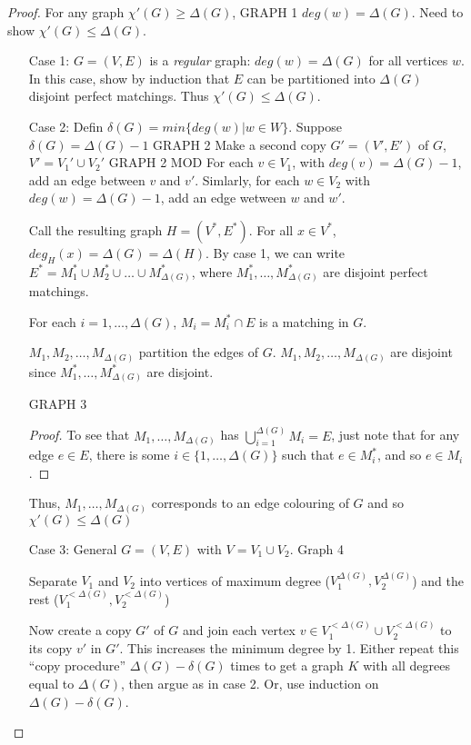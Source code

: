 \documentclass{article}
\begin{document}
\begin{proof}
For any graph $\chi'(G) \geq \Delta(G)$, GRAPH 1 $deg(w) = \Delta(G)$.  Need to show $\chi'(G)\leq \Delta(G)$.
\begin{enumerate}
\item[Case 1: ] $G=(V,E)$ is a \emph{regular} graph: $deg(w)=\Delta(G)$ for all vertices $w$.  In this case, show by induction that $E$ can be partitioned into $\Delta(G)$ disjoint perfect matchings.  Thus $\chi'(G) \leq \Delta(G)$.
\item[Case 2: ]  Defin $\delta(G) = min\{ deg(w) | w \in W\}$.  Suppose $\delta(G) = \Delta(G)-1$ GRAPH 2 
Make a second copy $G'=(V',E')$ of $G$, $V' = V_1' \cup V_2'$
GRAPH 2 MOD
For each $v \in V_1$,  with $deg(v) =\Delta(G)-1$, add an edge between $v$ and $v'$.  Simlarly, for each $w \in V_2$ with $deg(w) = \Delta(G)-1$, add an edge wetween $w$ and $w'$.

Call the resulting graph $H = (V^*, E^*)$.  For all $x \in V^*$, $deg_H(x) = \Delta(G) = \Delta(H)$.  By case 1, we can write $E^* = M_1^* \cup M_2^* \cup \ldots \cup M_{\Delta(G)}^*$, where $M_1^*, \ldots, M_{\Delta(G)}^*$ are disjoint perfect matchings.

For each $i = 1, \ldots, \Delta(G)$, $M_i = M_i^* \cap E$ is a matching in $G$.

\begin{clm}
$M_1, M_2, \ldots, M_{\Delta(G)}$ partition the edges of $G$. $M_1, M_2, \ldots, M_{\Delta(G)}$ are disjoint since $M_1^*, \ldots, M_{\Delta(G)}^*$ are disjoint.
\end{clm}

GRAPH 3

\begin{proof}
To see that $M_1, \ldots, M_{\Delta(G)}$ has $\displaystyle \bigcup_{i=1}^{\Delta(G)} M_i = E$, just note that for any edge $e \in E$, there is some $i \in \{1,\ldots, \Delta(G)\}$ such that $e \in M_i^*$, and so $e \in M_i$.
\end{proof}

Thus, $M_1, \ldots, M_{\Delta(G)}$ corresponds to an edge colouring of $G$ and so $\chi'(G) \leq \Delta(G)$

\item[Case 3: ] General $G = (V,E)$ with $V = V_1 \cup V_2$.
Graph 4

Separate $V_1$ and $V_2$ into vertices of maximum degree ($V_1^{\Delta(G)}, V_2^{\Delta(G)}$) and the rest  ($V_1^{<\Delta(G)}, V_2^{<\Delta(G)}$)

Now create a copy $G'$ of $G$ and join each vertex $v \in V_1^{<\Delta(G)} \cup V_2^{<\Delta(G)}$ to its copy $v'$ in $G'$.  This increases the minimum degree by 1.  Either repeat this ``copy procedure'' $\Delta(G) - \delta(G)$ times to get a graph $K$ with all degrees equal to $\Delta(G)$, then argue as in case 2.  Or, use induction on $\Delta(G) - \delta(G)$.
\end{enumerate}
\end{proof}
\end{document}
